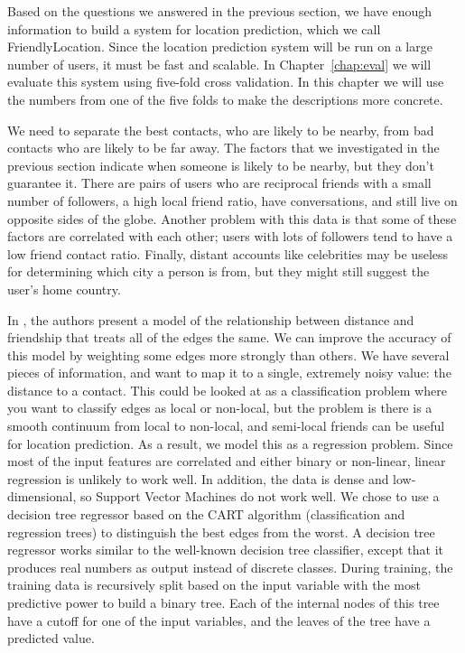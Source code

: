 
Based on the questions we answered in the previous section, we have enough
information to build a system for location prediction, which we call
FriendlyLocation.
%
Since the location prediction system will be run on a large number of users,
it must be fast and scalable.
%
In Chapter~\ref{chap:eval} we will evaluate this system using five-fold cross
validation.
%
In this chapter we will use the numbers from one of the five folds to make
the descriptions more concrete.


We need to separate the best contacts, who are likely to be nearby, from
bad contacts who are likely to be far away.
%
The factors that we investigated in the previous section indicate when someone
is likely to be nearby, but they don't guarantee it.
%
There are pairs of users who are reciprocal friends with a small number of
followers, a high local friend ratio, have conversations, and still live on
opposite sides of the globe.
%
Another problem with this data is that some of these factors are correlated
with each other; users with lots of followers tend to have a low friend contact
ratio.
%
Finally, distant accounts like celebrities may be useless for determining which
city a person is from, but they might still suggest the user's home country.

In \cite{backstrom2010find}, the authors present a model of the relationship
between distance and friendship that treats all of the edges the same.
%
We can improve the accuracy of this model by weighting some edges more strongly
than others.
%
We have several pieces of information, and want to map it to a single, extremely
noisy value: the distance to a contact.
%
This could be looked at as a classification problem where you want to classify
edges as local or non-local, but the problem is there is a smooth continuum
from local to non-local, and semi-local friends can be useful for location
prediction.
%
As a result, we model this as a regression problem.
%
Since most of the input features are correlated and either binary or non-linear,
linear regression is unlikely to work well.
%
In addition, the data is dense and low-dimensional, so Support Vector Machines
do not work well.
%
We chose to use a decision tree regressor based on the CART algorithm
(classification and regression trees) to distinguish the best edges from the
worst.
%
A decision tree regressor works similar to the well-known decision tree
classifier, except that it produces real numbers as output instead of discrete
classes.
%
During training, the training data is recursively split based on the input
variable with the most predictive power to build a binary tree.
%
Each of the internal nodes of this tree have a cutoff for one of the input
variables, and the leaves of the tree have a predicted value.
%

